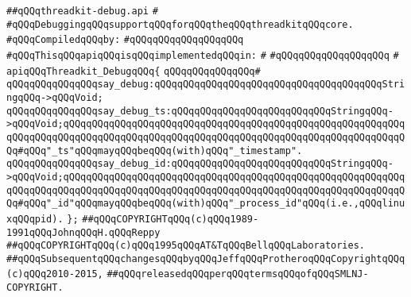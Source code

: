 \label{src/lib/src/lib/thread-kit/src/core-thread-kit/threadkit-debug.api}
\verb|##qQQqthreadkit-debug.api|\newline
\verb|#|\newline
\verb|#qQQqDebuggingqQQqsupportqQQqforqQQqtheqQQqthreadkitqQQqcore.|\newline
\newline
\verb|#qQQqCompiledqQQqby:|\newline
\verb|#qQQqqQQqqQQqqQQqqQQq|\newline
\newline
\verb|#qQQqThisqQQqapiqQQqisqQQqimplementedqQQqin:|\newline
\verb|#|\newline
\verb|#qQQqqQQqqQQqqQQqqQQq|\newline
\verb|#|\newline
\verb|apiqQQqThreadkit_DebugqQQq{|\newline
\verb|qQQqqQQqqQQqqQQq#|\newline
\verb|qQQqqQQqqQQqqQQqsay_debug:qQQqqQQqqQQqqQQqqQQqqQQqqQQqqQQqqQQqqQQqStringqQQq->qQQqVoid;|\newline
\verb|qQQqqQQqqQQqqQQqsay_debug_ts:qQQqqQQqqQQqqQQqqQQqqQQqqQQqStringqQQq->qQQqVoid;qQQqqQQqqQQqqQQqqQQqqQQqqQQqqQQqqQQqqQQqqQQqqQQqqQQqqQQqqQQqqQQqqQQqqQQqqQQqqQQqqQQqqQQqqQQqqQQqqQQqqQQqqQQqqQQqqQQqqQQqqQQqqQQqqQQq#qQQq"_ts"qQQqmayqQQqbeqQQq(with)qQQq"_timestamp".|\newline
\verb|qQQqqQQqqQQqqQQqsay_debug_id:qQQqqQQqqQQqqQQqqQQqqQQqqQQqStringqQQq->qQQqVoid;qQQqqQQqqQQqqQQqqQQqqQQqqQQqqQQqqQQqqQQqqQQqqQQqqQQqqQQqqQQqqQQqqQQqqQQqqQQqqQQqqQQqqQQqqQQqqQQqqQQqqQQqqQQqqQQqqQQqqQQqqQQqqQQqqQQq#qQQq"_id"qQQqmayqQQqbeqQQq(with)qQQq"_process_id"qQQq(i.e.,qQQqlinuxqQQqpid).|\newline
\verb|};|\newline
\newline
\newline
\verb|##qQQqCOPYRIGHTqQQq(c)qQQq1989-1991qQQqJohnqQQqH.qQQqReppy|\newline
\verb|##qQQqCOPYRIGHTqQQq(c)qQQq1995qQQqAT&TqQQqBellqQQqLaboratories.|\newline
\verb|##qQQqSubsequentqQQqchangesqQQqbyqQQqJeffqQQqProtheroqQQqCopyrightqQQq(c)qQQq2010-2015,|\newline
\verb|##qQQqreleasedqQQqperqQQqtermsqQQqofqQQqSMLNJ-COPYRIGHT.|\newline

